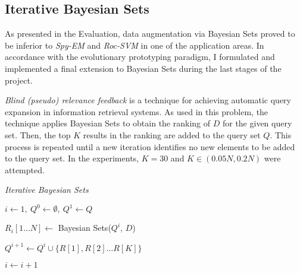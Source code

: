 \documentclass[12pt,twoside,notitlepage,amsart]{report} %
\begin{document}
	
	\subsection{Iterative Bayesian Sets}
	
	As presented in the Evaluation, data augmentation via Bayesian Sets proved to be inferior to \emph{Spy-EM} and \emph{Roc-SVM} in one of the application areas. In accordance with the evolutionary prototyping paradigm, I formulated and implemented a final extension to Bayesian Sets during the last stages of the project. 
	
	\emph{Blind (pseudo) relevance feedback} is a technique for achieving automatic query expansion in information retrieval systems. As used in this problem, the technique 
	applies Bayesian Sets to obtain the ranking of $D$ for the given query set. Then, the top $K$ results in the ranking are added to the query set $Q$. This process is repeated until a new iteration identifies no new elements to be added to the query set. In the experiments, $K = 30$ and $K \in (0.05N, 0.2N)$ were attempted. \\
	
	\renewcommand{\thealgorithm}{3.2}
	
	\begin{algorithm}
	  \caption{\emph{Iterative Bayesian Sets} 
	    \label{alg:bayesiansets2}}
	  \begin{algorithmic}[1]
	    \Statex
	       
	        \Statex
	        
	
	        \State $ i \gets 1,~ Q^{0} \gets \emptyset,~ Q^{1} \gets Q$        
	
	        \Statex
	        
	          
	        	
	        	\Statex
	        	\State $R_{i}[1 \ldots N] \gets $ Bayesian Sets($Q^i$, $D$) 
	        	
	        	\Statex
	        	\State $Q^{i+1} \gets Q^i \cup \{ R[1], R[2] \ldots R[K] \} $
	        	
	        	\Statex
	        	\State $i \gets i+1$                                
	        	\Statex
	        \EndWhile
	
					\Statex
	      
	  \end{algorithmic}
	\end{algorithm} \\
	
\end{document}
